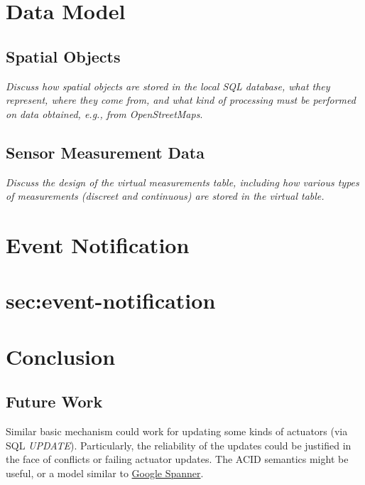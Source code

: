 \documentclass[conference,10pt]{IEEEtran}
\begin{document}
\section{Data Model}
\label{sec:data-model}

\subsection{Spatial Objects}
\label{sec:spatial-objects}

\textit{Discuss how spatial objects are stored in the local SQL database, what they represent, where they come from, and what kind of processing  must be performed on data obtained, e.g., from OpenStreetMaps}.

\subsection{Sensor Measurement Data}
\label{sec:sensor-measurements}

\textit{Discuss the design of the virtual measurements table, including how various types of measurements (discreet and continuous) are stored in the virtual table.}

\section{Event Notification}
\section{sec:event-notification}

\section{Conclusion}
\label{sec:conclusion}

\subsection{Future Work}
\label{sec:future-work}

Similar basic mechanism could work for updating some kinds of actuators (via SQL \textit{UPDATE}). Particularly, the reliability of the updates could be justified in the face of conflicts or failing actuator updates. The ACID semantics might be useful, or a model similar to \href{https://dl.acm.org/doi/pdf/10.1145/2491245}{Google Spanner}.



\end{document}
